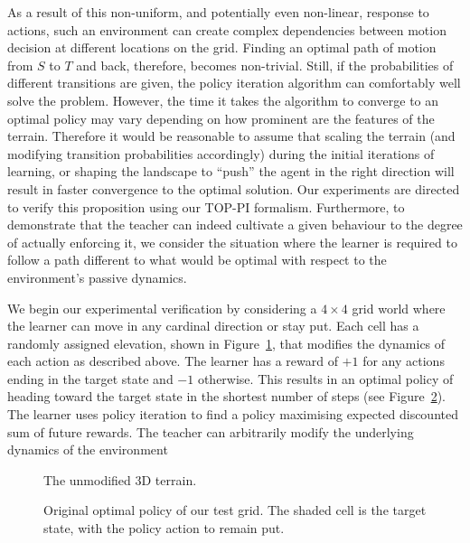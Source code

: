 As a result of this non-uniform, and potentially even non-linear,
response to actions, such an environment can create complex
dependencies between motion decision at different locations on the
grid. Finding an optimal path of motion from $S$ to $T$ and back,
therefore, becomes non-trivial. Still, if the probabilities of
different transitions are given, the policy iteration algorithm can
comfortably well solve the problem. However, the time it takes the
algorithm to converge to an optimal policy may vary depending on how
prominent are the features of the terrain. Therefore it would be
reasonable to assume that scaling the terrain (and modifying
transition probabilities accordingly) during the initial iterations of
learning, or shaping the landscape to ``push'' the agent in the right
direction will result in faster convergence to the optimal
solution. Our experiments are directed to verify this proposition
using our TOP-PI formalism.  Furthermore, to demonstrate that the
teacher can indeed cultivate a given behaviour to the degree of actually 
enforcing it, we consider the situation where the learner is required
to follow a path different to what would be optimal with respect to
the environment's passive dynamics. %

We begin our experimental verification by considering a $4 \times 4$
grid world where the learner can move in any cardinal direction or
stay put.  Each cell has a randomly assigned elevation, shown in
Figure~\ref{probalt}, that modifies the dynamics of each action as
described above.  The learner has a reward of $+1$ for any actions
ending in the target state and $-1$ otherwise.  This results in an
optimal policy of heading toward the target state in the shortest
number of steps (see Figure~\ref{prevopt}).  The learner uses policy
iteration to find a policy maximising expected discounted sum of
future rewards. The teacher can arbitrarily modify the underlying
dynamics of the environment

\begin{figure}[ht]
\centerline{}
\caption{\label{probalt}The unmodified 3D terrain.}
\end{figure}

\begin{figure}[ht]
\centerline{}
\caption{\label{prevopt}Original optimal policy of our test grid.  The shaded cell is the target state, with the policy action to remain put.}
\end{figure}

